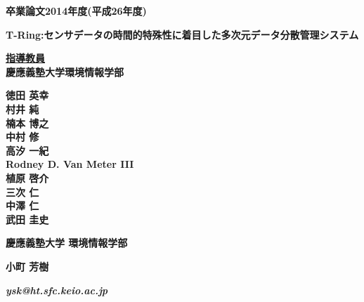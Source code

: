 \pagestyle{empty}

\begin{center}

\vspace{5cm}

\textbf{\Large 卒業論文2014年度(平成26年度)}

\vspace{1cm}

\textbf{\LARGE T-Ring:センサデータの時間的特殊性に着目した多次元データ分散管理システム}
\vspace{3cm}

\textbf{\underline{\large 指導教員}}\\
\textbf{慶應義塾大学環境情報学部}

\textbf{\Large 徳田 英幸}\\
\textbf{\Large 村井 純}\\
\textbf{\Large 楠本 博之}\\
\textbf{\Large 中村 修}\\
\textbf{\Large 高汐 一紀}\\
\textbf{\Large Rodney D. Van Meter III}\\
\textbf{\Large 植原 啓介}\\
\textbf{\Large 三次 仁}\\
\textbf{\Large 中澤 仁}\\
\textbf{\Large 武田 圭史}

\vspace{6cm}

\textbf{\LARGE 慶應義塾大学 環境情報学部}

\vspace{.5em}

\textbf{\LARGE 小町 芳樹}

\vspace{.3em}

\textbf{\it ysk@ht.sfc.keio.ac.jp}



\newpage

\end{center}

\pagestyle{plain}
